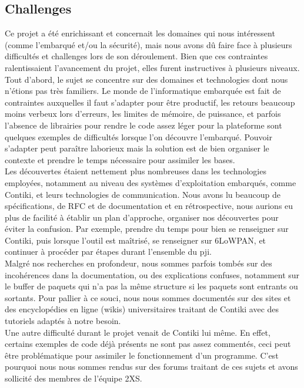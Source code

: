 	\subsection{Challenges} %
	 Ce projet a été enrichissant et concernait les domaines qui nous intéressent (comme l'embarqué et/ou la sécurité), mais nous avons dû faire face à plusieurs difficultés et challenges lors de son déroulement. Bien que ces contraintes ralentissaient l'avancement du projet, elles furent instructives à plusieurs niveaux.\\
	 Tout d'abord, le sujet se concentre sur des domaines et technologies dont nous n'étions pas très familiers. Le monde de l'informatique embarquée est fait de contraintes auxquelles il faut s'adapter pour être productif, les retours beaucoup moins verbeux lors d'erreurs, les limites de mémoire, de puissance, et parfois l'absence de librairies pour rendre le code assez léger pour la plateforme sont quelques exemples de difficultés lorsque l'on découvre l'embarqué. Pouvoir s'adapter peut paraître laborieux mais la solution est de bien organiser le contexte et prendre le temps nécessaire pour assimiler les bases.\\
	 Les découvertes étaient nettement plus nombreuses dans les technologies employées, notamment au niveau des systèmes d'exploitation embarqués, comme Contiki, et leurs technologies de communication. Nous avons lu beaucoup de spécifications, de RFC et de documentation et en rétrospective, nous aurions eu plus de facilité à établir un plan d'approche, organiser nos découvertes pour éviter la confusion. Par exemple, prendre du temps pour bien se renseigner sur Contiki, puis lorsque l'outil est maîtrisé, se renseigner sur 6LoWPAN, et continuer à procéder par étapes durant l'ensemble du pji.\\
	 Malgré nos recherches en profondeur, nous sommes parfois tombés sur des incohérences dans la documentation, ou des explications confuses, notamment sur le buffer de paquets qui n'a pas la même structure si les paquets sont entrants ou sortants. Pour pallier à ce souci, nous nous sommes documentés sur des sites et des encyclopédies en ligne (wikis) universitaires traitant de Contiki avec des tutoriels adaptés à notre besoin.\\
	 Une autre difficulté durant le projet venait de Contiki lui même. En effet, certains exemples de code déjà présents ne sont pas assez commentés, ceci peut être problématique pour assimiler le fonctionnement d'un programme. C'est pourquoi nous nous sommes rendus sur des forums traitant de ces sujets et avons sollicité des membres de l'équipe 2XS.

